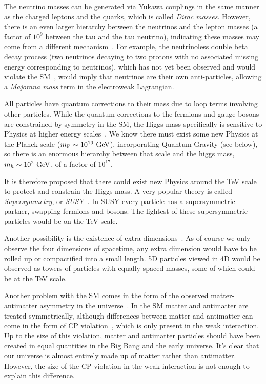 The neutrino masses can be generated via Yukawa couplings in the same manner as the charged leptons and the quarks, which is called \textit{Dirac masses}.
However, there is an even larger hierarchy between the neutrinos and the lepton masses (a factor of $10^9$ between the tau and the tau neutrino), indicating these masses may come from a different mechanism~\cite{King:2003jb}.
For example, the neutrinoless double beta decay process (two neutrinos decaying to two protons with no associated missing energy corresponding to neutrinos), which has not yet been observed and would violate the SM~\cite{Schwingenheuer:2012zs}, would imply that neutrinos are their own anti-particles, allowing a \textit{Majorana mass} term in the electroweak Lagrangian.

All particles have quantum corrections to their mass due to loop terms involving other particles.
While the quantum corrections to the fermions and gauge bosons are constrained by symmetry in the SM, the Higgs mass specifically is sensitive to Physics at higher energy scales~\cite{Csaki:2016kln,deGouvea:2014xba}.
We know there must exist some new Physics at the Planck scale ($m_\text{P}\sim10^{19}~\mathrm{GeV}$), incorporating Quantum Gravity (see below), so there is an enormous hierarchy between that scale and the higgs mass, $m_h\sim 10^2~\mathrm{GeV}$, of a factor of $10^{17}$.

It is therefore proposed that there could exist new Physics around the TeV scale to protect and constrain the Higgs mass.
A very popular theory is called \textit{Supersymmetry}, or \textit{SUSY}~\cite{wess_bagger_2009,Wess:1984jr,Lykken:1996xt,Quevedo:2010ui,Strassler:2003qg,Peskin:1997qi,Seiberg:1994pq,Intriligator:2007cp}.
In SUSY every particle has a supersymmetric partner, swapping fermions and bosons.
The lightest of these supersymmetric particles would be on the TeV scale.

Another possibility is the existence of extra dimensions~\cite{Kaluza:1921tu,Klein:1926tv,Einstein:1938fk,Csaki:2004ay,Csaki:2005vy,Rattazzi:2003ea,Ponton:2012bi,Cheng:2010pt}.
As of course we only observe the four dimensions of spacetime, any extra dimension would have to be rolled up or compactified into a small length.
5D particles viewed in 4D would be observed as towers of particles with equally spaced masses, some of which could be at the TeV scale.

Another problem with the SM comes in the form of the observed matter-antimatter asymmetry in the universe~\cite{Canetti:2012zc}.
In the SM matter and antimatter are treated symmetrically, although differences between matter and antimatter can come in the form of CP violation~\cite{Sakharov:1967dj}, which is only present in the weak interaction.
Up to the size of this violation, matter and antimatter particles should have been created in equal quantities in the Big Bang and the early universe.
It's clear that our universe is almost entirely made up of matter rather than antimatter.
However, the size of the CP violation in the weak interaction is not enough to explain this difference.

